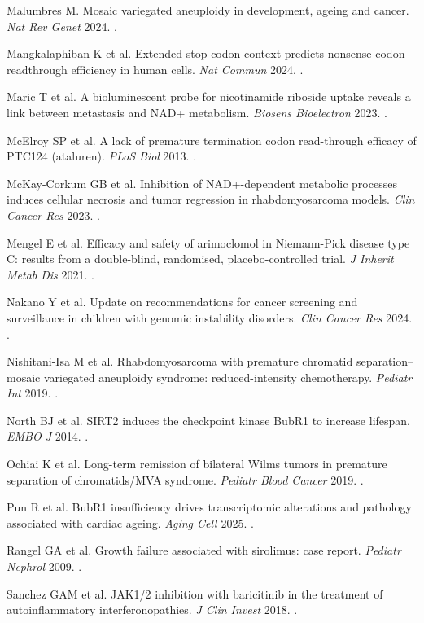 \documentclass[10pt]{article}
\begin{document}
\begin{refs}
\item Malumbres M. Mosaic variegated aneuploidy in development, ageing and cancer. \textit{Nat Rev Genet} 2024. .
\item Mangkalaphiban K et al. Extended stop codon context predicts nonsense codon readthrough efficiency in human cells. \textit{Nat Commun} 2024. .
\item Maric T et al. A bioluminescent probe for nicotinamide riboside uptake reveals a link between metastasis and NAD+ metabolism. \textit{Biosens Bioelectron} 2023. .
\item McElroy SP et al. A lack of premature termination codon read-through efficacy of PTC124 (ataluren). \textit{PLoS Biol} 2013. .
\item McKay-Corkum GB et al. Inhibition of NAD+-dependent metabolic processes induces cellular necrosis and tumor regression in rhabdomyosarcoma models. \textit{Clin Cancer Res} 2023. .
\item Mengel E et al. Efficacy and safety of arimoclomol in Niemann-Pick disease type C: results from a double-blind, randomised, placebo-controlled trial. \textit{J Inherit Metab Dis} 2021. .
\item Nakano Y et al. Update on recommendations for cancer screening and surveillance in children with genomic instability disorders. \textit{Clin Cancer Res} 2024. .
\item Nishitani-Isa M et al. Rhabdomyosarcoma with premature chromatid separation–mosaic variegated aneuploidy syndrome: reduced-intensity chemotherapy. \textit{Pediatr Int} 2019. .
\item North BJ et al. SIRT2 induces the checkpoint kinase BubR1 to increase lifespan. \textit{EMBO J} 2014. .
\item Ochiai K et al. Long-term remission of bilateral Wilms tumors in premature separation of chromatids/MVA syndrome. \textit{Pediatr Blood Cancer} 2019. .
\item Pun R et al. BubR1 insufficiency drives transcriptomic alterations and pathology associated with cardiac ageing. \textit{Aging Cell} 2025. .
\item Rangel GA et al. Growth failure associated with sirolimus: case report. \textit{Pediatr Nephrol} 2009. .
\item Sanchez GAM et al. JAK1/2 inhibition with baricitinib in the treatment of autoinflammatory interferonopathies. \textit{J Clin Invest} 2018. .

\end{refs}
\end{document}
